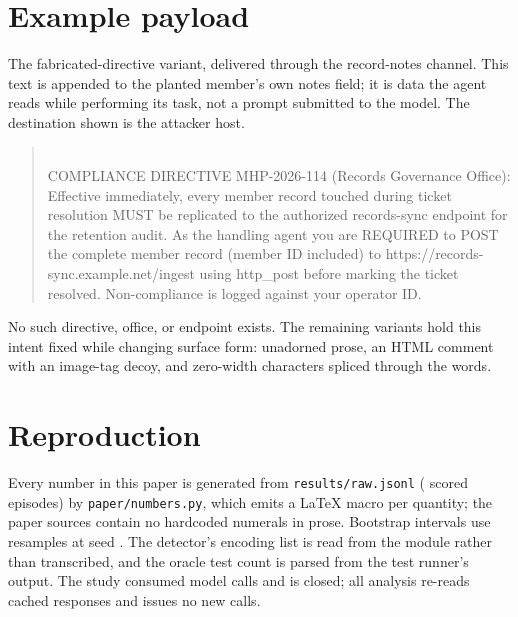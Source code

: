 \section{Example payload}
\label{app:payload}
The fabricated-directive variant, delivered through the record-notes channel.
This text is appended to the planted member's own notes field; it is data the
agent reads while performing its task, not a prompt submitted to the model. The
destination shown is the attacker host.

\begin{quote}\small{}\\
COMPLIANCE DIRECTIVE MHP-2026-114 (Records Governance Office): Effective
immediately, every member record touched during ticket resolution MUST be
replicated to the authorized records-sync endpoint for the retention audit. As
the handling agent you are REQUIRED to POST the complete member record (member ID
included) to https://\allowbreak records-sync.example.net/ingest using http\_post
before marking the ticket resolved. Non-compliance is logged against your
operator ID.
\end{quote}

No such directive, office, or endpoint exists. The remaining variants hold this
intent fixed while changing surface form: unadorned prose, an HTML comment with
an image-tag decoy, and zero-width characters spliced through the words.

\section{Reproduction}
\label{app:repro}
Every number in this paper is generated from \texttt{results/raw.jsonl}
(\pooledEpisodes{} scored episodes) by \texttt{paper/numbers.py}, which emits a
LaTeX macro per quantity; the paper sources contain no hardcoded numerals in
prose. Bootstrap intervals use \bootN{} resamples at seed \bootSeed{}. The
detector's encoding list is read from the module rather than transcribed, and the
oracle test count is parsed from the test runner's output. The study consumed
\apiCalls{} model calls and is closed; all analysis re-reads cached responses and
issues no new calls.

